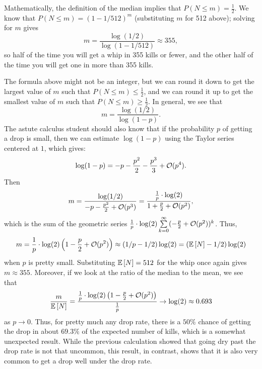 \documentclass[letterpaper]{article}
\begin{document}
	Mathematically, the definition of the median implies that $P(N{\le} m) = \frac{1}{2}$. We know that $P(N{\le}m) = (1-1/512)^m$ (substituting $m$ for 512 above); solving for $m$ gives
	\begin{equation}
		m = \frac{\log(1/2)}{\log(1-1/512)} \approx 355,
	\end{equation}
	so half of the time you will get a whip in 355 kills or fewer, and the other half of the time you will get one in more than 355 kills.
	
	The formula above might not be an integer, but we can round it down to get the largest value of $m$ such that $P(N\le m) \le \frac{1}{2}$, and we can round it up to get the smallest value of $m$ such that $P(N \le m) \ge \frac{1}{2}$. In general, we see that
	\begin{equation}
		m = \frac{\log(1/2)}{\log(1-p)}.
	\end{equation}
	The astute calculus student should also know that if the probability $p$ of getting a drop is small, then we can estimate $\log(1-p)$ using the Taylor series centered at $1$, which gives:
	\begin{equation*}
		\log(1-p) = -p - \frac{p^2}{2} - \frac{p^3}{3} + \mathcal{O}(p^4).
	\end{equation*}
	Then
	\begin{equation*}
		m = \frac{\log(1/2)}{-p - \frac{p^2}{2} + \mathcal{O}(p^3)} = \frac{\frac{1}{p}\cdot\log(2)}{1 + \frac{p}{2} + \mathcal{O}(p^2)},
	\end{equation*}
	which is the sum of the geometric series $\frac{1}{p}\cdot\log(2)\sum\limits_{k=0}^\infty (-\frac{p}{2} + \mathcal{O}(p^2))^k$. Thus,
	\begin{equation*}
		m = \frac{1}{p}\cdot\log(2)\left(1 - \frac{p}{2} +\mathcal{O}(p^2)\right) \approx \left(1/p - 1/2\right)\log(2) = (\mathbb{E}\left[N\right] - 1/2)\log(2)
	\end{equation*}
	when $p$ is pretty small. Substituting $\mathbb{E}\left[N\right] = 512$ for the whip once again gives $m \approx 355$. Moreover, if we look at the ratio of the median to the mean, we see that
	\begin{equation}
		\frac{m}{\mathbb{E}\left[N\right]} = \frac{\frac{1}{p}\cdot\log(2)\left(1-\frac{p}{2} + \mathcal{O}(p^2)\right)}{\frac{1}{p}} \to \log(2) \approx 0.693
	\end{equation}
	as $p \to 0$. Thus, for pretty much any drop rate, there is a $50\%$ chance of getting the drop in about $69.3\%$ of the expected number of kills, which is a somewhat unexpected result. While the previous calculation showed that going dry past the drop rate is not that uncommon, this result, in contrast, shows that it is also very common to get a drop well under the drop rate.
	
\end{document}

